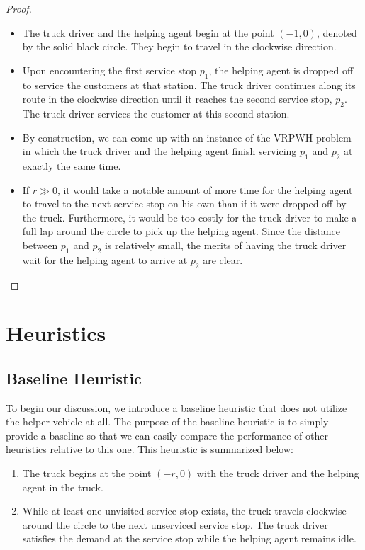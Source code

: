 \documentclass[12pt]{scrartcl}
\begin{document}
\begin{proof}
\begin{itemize}
    \item The truck driver and the helping agent begin at the point $(-1, 0)$, denoted by the solid black circle. They begin to travel in the clockwise direction. 
    \item Upon encountering the first service stop $p_1$, the helping agent is dropped off to service the customers at that station. The truck driver continues along its route in the clockwise direction until it reaches the second service stop, $p_2$. The truck driver services the customer at this second station. 
    \item By construction, we can come up with an instance of the VRPWH problem in which the truck driver and the helping agent finish servicing $p_1$ and $p_2$ at exactly the same time.  
    \item If $r \gg 0$, it would take a notable amount of more time for the helping agent to travel to the next service stop on his own than if it were dropped off by the truck. Furthermore, it would be too costly for the truck driver to make a full lap around the circle to pick up the helping agent. Since the distance between $p_1$ and $p_2$ is relatively small, the merits of having the truck driver wait for the helping agent to arrive at $p_2$ are clear. 
\end{itemize}
\end{proof}



\section{Heuristics}
\subsection{Baseline Heuristic}
To begin our discussion, we introduce a baseline heuristic that does not utilize the helper vehicle at all. The purpose of the baseline heuristic is to simply provide a baseline so that we can easily compare the performance of other heuristics relative to this one. This heuristic is summarized below:

\begin{enumerate}
    \item The truck begins at the point $(-r, 0)$ with the truck driver and the helping agent in the truck. 
    \item While at least one unvisited service stop exists, the truck travels clockwise around the circle to the next unserviced service stop. The truck driver satisfies the demand at the service stop while the helping agent remains idle. 
\end{enumerate}
\end{document}
